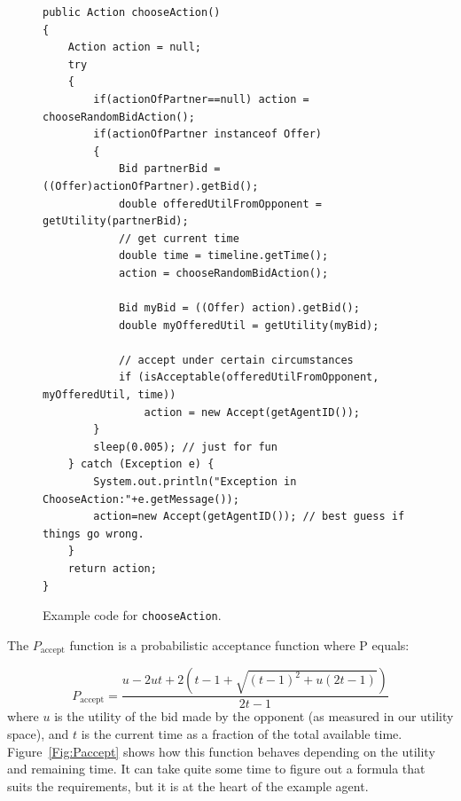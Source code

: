 \documentclass[]{article}
\begin{document}
\begin{figure}[htb]
\begin{lstlisting}
public Action chooseAction()
{
	Action action = null;
	try 
	{ 
		if(actionOfPartner==null) action = chooseRandomBidAction();
		if(actionOfPartner instanceof Offer)
		{
			Bid partnerBid = ((Offer)actionOfPartner).getBid();
			double offeredUtilFromOpponent = getUtility(partnerBid);
			// get current time
			double time = timeline.getTime();
			action = chooseRandomBidAction();
			
			Bid myBid = ((Offer) action).getBid();
			double myOfferedUtil = getUtility(myBid);
			
			// accept under certain circumstances
			if (isAcceptable(offeredUtilFromOpponent, myOfferedUtil, time))
				action = new Accept(getAgentID());
		}
		sleep(0.005); // just for fun
	} catch (Exception e) { 
		System.out.println("Exception in ChooseAction:"+e.getMessage());
		action=new Accept(getAgentID()); // best guess if things go wrong. 
	}
	return action;
}
\end{lstlisting}
\caption{Example code for \texttt{chooseAction}.}\label{Code:chooseAction}
\end{figure}

The $P_\text{accept}$ function is a probabilistic acceptance function where P equals:

\begin{equation}
	P_\text{accept} = \dfrac{u - 2ut + 2\left(t - 1 + \sqrt{(t - 1)^2 + u(2t - 1)}\right)}{2t - 1}
\end{equation}
where $u$ is the utility of the bid made by the opponent (as measured in our utility space), and $t$ is the current time as a fraction of the total available time. 
Figure~\ref{Fig:Paccept} shows how this function behaves depending on the utility and remaining time. It can take quite some time to figure out a formula that suits the requirements, but it is at the heart of the example agent.
\end{document}
